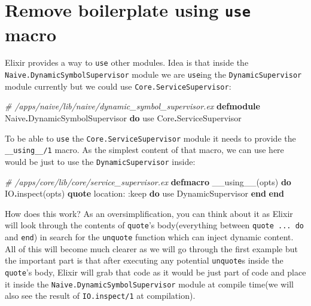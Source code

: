 \documentclass[
]{book}
\newenvironment{Shaded}{\begin{snugshade}}{\end{snugshade}}
\newcommand{\CommentTok}[1]{\textcolor[rgb]{0.56,0.35,0.01}{\textit{#1}}}
\newcommand{\ConstantTok}[1]{\textcolor[rgb]{0.00,0.00,0.00}{#1}}
\newcommand{\ImportTok}[1]{#1}
\newcommand{\KeywordTok}[1]{\textcolor[rgb]{0.13,0.29,0.53}{\textbf{#1}}}
\newcommand{\NormalTok}[1]{#1}
\newcommand{\OperatorTok}[1]{\textcolor[rgb]{0.81,0.36,0.00}{\textbf{#1}}}
\newcommand{\VariableTok}[1]{\textcolor[rgb]{0.00,0.00,0.00}{#1}}
\begin{document}
\hypertarget{remove-boilerplate-using-use-macro}{%
\section{\texorpdfstring{Remove boilerplate using \texttt{use} macro}{Remove boilerplate using use macro}}\label{remove-boilerplate-using-use-macro}}

Elixir provides a way to \texttt{use} other modules. Idea is that inside the \texttt{Naive.DynamicSymbolSupervisor} module we are \texttt{use}ing the \texttt{DynamicSupervisor} module currently but we could use \texttt{Core.ServiceSupervisor}:

\begin{Shaded}
\begin{Highlighting}[]
\CommentTok{\# /apps/naive/lib/naive/dynamic\_symbol\_supervisor.ex}
\KeywordTok{defmodule} \ConstantTok{Naive}\OperatorTok{.}\ConstantTok{DynamicSymbolSupervisor} \KeywordTok{do}
  \ImportTok{use} \ConstantTok{Core}\OperatorTok{.}\ConstantTok{ServiceSupervisor}
\end{Highlighting}
\end{Shaded}

To be able to \texttt{use} the \texttt{Core.ServiceSupervisor} module it needs to provide the \texttt{\_\_using\_\_/1} macro. As the simplest content of that macro, we can use here would be just to use the \texttt{DynamicSupervisor} inside:

\begin{Shaded}
\begin{Highlighting}[]
  \CommentTok{\# /apps/core/lib/core/service\_supervisor.ex}
  \KeywordTok{defmacro}\NormalTok{ \_\_using\_\_(opts) }\KeywordTok{do}
    \ConstantTok{IO}\OperatorTok{.}\NormalTok{inspect(opts)}
    \KeywordTok{quote} \VariableTok{location:} \VariableTok{:keep} \KeywordTok{do}
      \ImportTok{use} \ConstantTok{DynamicSupervisor}
    \KeywordTok{end}
  \KeywordTok{end}
\end{Highlighting}
\end{Shaded}

How does this work? As an oversimplification, you can think about it as Elixir will look through the contents of \texttt{quote}'s body(everything between \texttt{quote\ ...\ do} and \texttt{end}) in search for the \texttt{unquote} function which can inject dynamic content. All of this will become much clearer as we will go through the first example but the important part is that after executing any potential \texttt{unquote}s inside the \texttt{quote}'s body, Elixir will grab that code as it would be just part of code and place it inside the \texttt{Naive.DynamicSymbolSupervisor} module at compile time(we will also see the result of \texttt{IO.inspect/1} at compilation).
\end{document}
